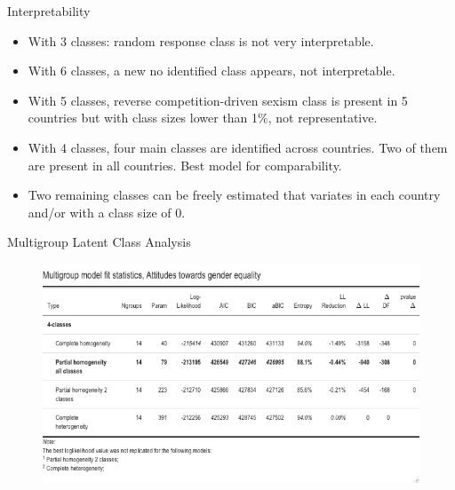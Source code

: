 \documentclass[11pt,t]{beamer}
\begin{document}
\begin{frame}{Interpretability}
	
\vspace{3.1mm}
\begin{itemize} 
\item With 3 classes: random response class is not very interpretable.

\vspace{3.1mm} 
\item With 6 classes, a new no identified class appears, not interpretable.

\vspace{3.1mm} 
\item With 5 classes, reverse competition-driven sexism class is present in 5 countries but with class sizes lower than 1\%, not representative.


\vspace{3.1mm} 
\item With 4 classes, four main classes are identified across countries.  Two of them are present in all countries. Best model for comparability.
\vspace{3.1mm} 
\item Two remaining classes can be freely estimated that variates in each country and/or with a class size of 0.

\end{itemize}
\end{frame} 

\begin{frame}{Multigroup Latent Class Analysis}

\vspace{-3.1mm} 
\begin{figure}
	\centering
	\includegraphics[height=0.5\textwidth]{graphics/MGmodelfitgender.png}
\end{figure}
\end{frame} 
\end{document}
